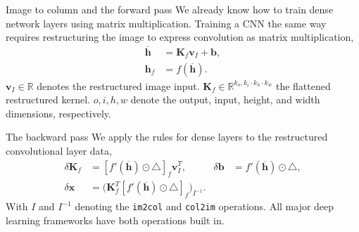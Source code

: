 \documentclass{beamer}
\begin{document}
    \begin{frame}{Image to column and the forward pass}
        We already know how to train dense network layers using matrix multiplication.
        Training a CNN the same way requires restructuring the image to express convolution as matrix multiplication,
        \begin{align}
            \overline{\mathbf{h}} &= \mathbf{K}_f \mathbf{v}_I  + \mathbf{b}, \\ 
            \mathbf{h}_f &= f(\overline{\mathbf{h}}).
        \end{align}
        $\mathbf{v}_I \in \mathbb{R}$ denotes the restructured image input. $\mathbf{K}_f \in \mathbb{R}^{k_o, k_i \cdot k_h \cdot k_w}$ the flattened restructured kernel.
        $o,i,h,w$ denote the output, input, height, and width dimensions, respectively.
    \end{frame}

    \begin{frame}{The backward pass}
        We apply the rules for dense layers to the restructured convolutional layer data,
        \begin{align} 
            \delta \mathbf{K}_f &= [f'(\overline{\mathbf{h}}) \odot \triangle]_f \mathbf{v}^T_I,  &  
            \delta \mathbf{b} &= f'(\overline{\mathbf{h}}) \odot \triangle,   \\  
            \delta \mathbf{x} &= \big(\mathbf{K}_f^T [f'(\overline{\mathbf{h}}) \odot \triangle]_f \big)_{I^{-1}}.
        \end{align}
        With $I$ and $I^{-1}$ denoting the \texttt{im2col} and \texttt{col2im} operations.
        All major deep learning frameworks have both operations built in.
    \end{frame}
		
\end{document}
